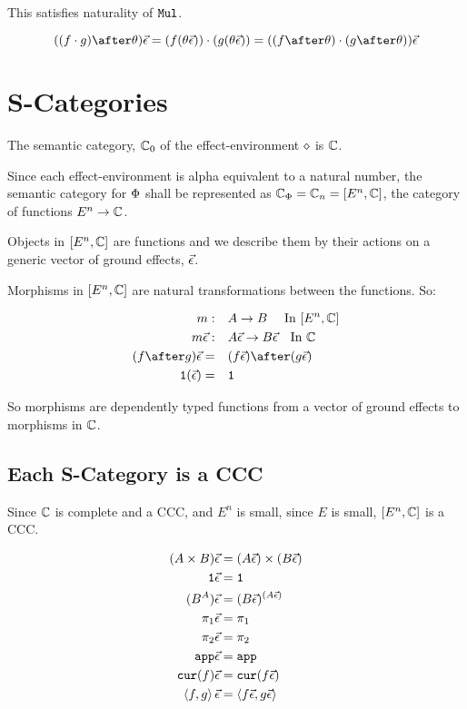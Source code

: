 \documentclass{report}
\newcommand\ev[0]{\vec{\e}}
\begin{document}
This satisfies naturality of $\Mul$.

\begin{equation}
    ((f\dot g)\after \theta)\ev = (f(\theta\ev))\dot(g(\theta\ev)) = ((f\after\theta)\dot(g\after\theta))\ev
\end{equation}

\section{S-Categories}
The semantic category, $\C_0$ of the effect-environment $\nil$ is $\C$.

Since each effect-environment is alpha equivalent to a natural number, the semantic category for $\P$ shall be represented as $\C_{\P} = \C_n = [E^n, \C]$, the category of functions $E^n\rightarrow \C$.

Objects in $[E^n, \C]$ are functions and we describe them by their actions on a generic vector of ground effects, $\ev$.

Morphisms in $[E^n, \C]$ are natural transformations between the functions. So:

\begin{align}
    m:\quad&A \rightarrow B \qt{ In $[E^n, \C]$}\\
    m\ev:\quad& A\ev \rightarrow B\ev \qt{In $\C$}\\
    (f\after g)\ev =\quad& (f\ev)\after(g\ev)\\
    \1(\ev) =\quad& \1
\end{align}

So morphisms are dependently typed functions from a vector of ground effects to morphisms in $\C$.
\subsection{Each S-Category is a CCC}
Since $\C$ is complete and a CCC, and $E^n$ is small, since $E$ is small, $[E^n, \C]$ is a CCC.

\begin{align}
    (A\times B)\ev & = (A\ev)\times(B\ev)\\
    \1\ev & = \1\\
    (B^A)\ev &= (B\ev)^{(A\ev)}\\
    \p\ev & = \p\\
    \pp\ev & = \pp\\
    \app\ev & = \app\\
    \cur{f}\ev & = \cur{f\ev}\\
    \pr{f}{g}\ev & = \pr{f\ev}{g\ev}\\
\end{align}
\end{document}
